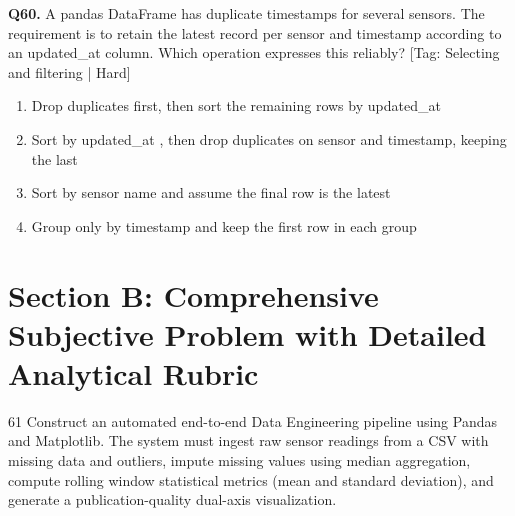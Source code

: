 \vspace{2mm}
\noindent\textbf{Q60.} A pandas DataFrame has duplicate timestamps for several sensors. The requirement is to retain the latest record per sensor and timestamp according to an updated\_at column. Which operation expresses this reliably? \hfill [Tag: Selecting and filtering | Hard]
\begin{enumerate}[label=(\alph*),topsep=2pt,itemsep=1pt,partopsep=0pt,parsep=0pt]
    \item {Drop duplicates first, then sort the remaining rows by updated\_at}
    \item {Sort by updated\_at , then drop duplicates on sensor and timestamp, keeping the last}
    \item {Sort by sensor name and assume the final row is the latest}
    \item {Group only by timestamp and keep the first row in each group}
\end{enumerate}
\vspace{2mm}

\section{Section B: Comprehensive Subjective Problem with Detailed Analytical Rubric}

\begin{subjectiveq}{6}{1}
Construct an automated end-to-end Data Engineering pipeline using Pandas and Matplotlib. The system must ingest raw sensor readings from a CSV with missing data and outliers, impute missing values using median aggregation, compute rolling window statistical metrics (mean and standard deviation), and generate a publication-quality dual-axis visualization.
\end{subjectiveq}

